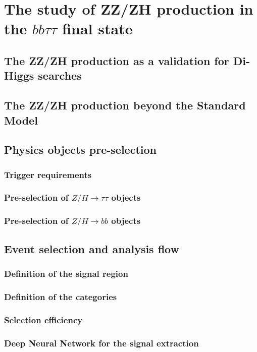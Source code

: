 \chapter{The study of ZZ/ZH production in the $bb\tau\tau$ final state}

\section{The ZZ/ZH production as a validation for Di-Higgs searches}

\section{The ZZ/ZH production beyond the Standard Model}

\section{Physics objects pre-selection}
\subsection {Trigger requirements}
\subsection {Pre-selection of $Z/H \rightarrow \tau\tau$ objects}
\subsection {Pre-selection of $Z/H \rightarrow bb$ objects}

\section{Event selection and analysis flow}
\subsection{Definition of the signal region}
\subsection{Definition of the categories}
\subsection{Selection efficiency}
\subsection{Deep Neural Network for the signal extraction}

